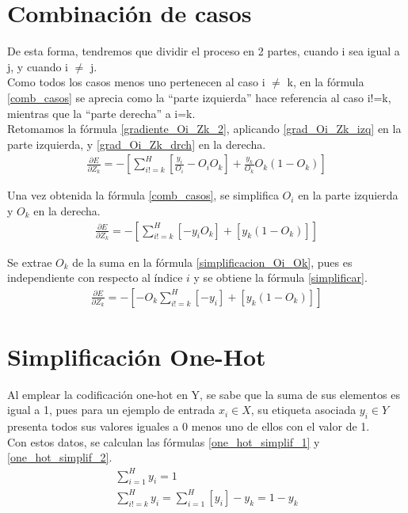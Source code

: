 \section{Combinación de casos}

De esta forma, tendremos que dividir  el proceso en 2 partes, cuando i sea igual a j, y cuando i $\neq$ j. \\
Como todos los casos menos uno pertenecen al caso i $\neq$ k, en la fórmula \ref{comb_casos} se aprecia como la ``parte izquierda'' hace referencia al caso i!=k, mientras que la ``parte derecha'' a i=k. \\
Retomamos la fórmula \ref{gradiente_Oi_Zk_2}, aplicando \ref{grad_Oi_Zk_izq} en la parte izquierda, y \ref{grad_Oi_Zk_drch} en la derecha. \\
\begin{gather}
	\frac{\partial E}{\partial Z_k} = - [\sum_{i!=k}^{H} [\frac{y_i}{O_i}   -O_i   O_k ] + \frac{y_k}{O_k}   O_k   (1 - O_k)  ]
	\label{comb_casos}
\end{gather}

Una vez obtenida la fórmula \ref{comb_casos}, se simplifica $O_i$ en la parte izquierda y $O_k$ en la derecha. \\
\begin{gather}
	\frac{\partial E}{\partial Z_k} = - [\sum_{i!=k}^{H} [- y_i   O_k] + [y_k   (1 - O_k) ] ] 
	\label{simplificacion_Oi_Ok}
\end{gather}

Se extrae $O_k$ de la suma en la fórmula \ref{simplificacion_Oi_Ok}, pues es independiente con respecto al índice $i$ y se obtiene la fórmula \ref{simplificar}.\\
\begin{gather}	
	\frac{\partial E}{\partial Z_k} = - [-O_k \sum_{i!=k}^{H}[-y_i] + [y_k   (1 - O_k) ] ]
	\label{simplificar}
\end{gather}

\section{Simplificación One-Hot}

Al emplear la codificación one-hot en Y, se sabe que la suma de sus elementos es igual a 1, pues para un ejemplo de entrada $x_i \in X$, su etiqueta asociada $y_i \in Y$ presenta todos sus valores iguales a 0 menos uno de ellos con el valor de 1. \\
Con estos datos, se calculan las fórmulas \ref{one_hot_simplif_1} y \ref{one_hot_simplif_2}.
\begin{gather}
	\sum_{i=1}^{H} y_i = 1 \label{one_hot_simplif_1}\\
	\sum_{i!=k}^{H} y_i = \sum_{i=1}^{H} [y_i] - y_k = 1 - y_k
	\label{one_hot_simplif_2}
\end{gather}

